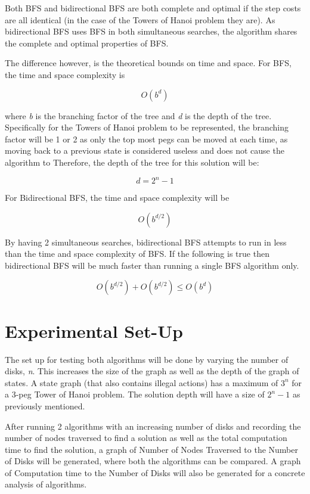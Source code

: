 \documentclass[conference]{IEEEtran}
\begin{document}
Both BFS and bidirectional BFS are both complete and optimal if the step costs are all identical (in the case of the Towers of Hanoi problem they are). As bidirectional BFS uses BFS in both simultaneous searches, the algorithm shares the complete and optimal properties of BFS.

The difference however, is the theoretical bounds on time and space. For BFS, the time and space complexity is 

\begin{equation}
 O(b^d)
\end{equation}

where \textit{b} is the branching factor of the tree and \textit{d} is the depth of the tree. Specifically for the Towers of Hanoi problem to be represented, the branching factor will be 1 or 2 as only the top most pegs can be moved at each time, as moving back to a previous state is considered useless and does not cause the algorithm to Therefore, the depth of the tree for this solution will be:

\begin{equation}
d = 2^n - 1
\end{equation}

For Bidirectional BFS, the time and space complexity will be 

\begin{equation}
 O(b^{d/2})
\end{equation}

By having 2 simultaneous searches, bidirectional BFS attempts to run in less than the time and space complexity of BFS. If 
the following is true then bidirectional BFS will be much faster than running a single BFS algorithm only. \cite{Textbook01}

\begin{equation}
O(b^{d/2}) + O(b^{d/2}) \leq O(b^d)
\end{equation}

\section{Experimental Set-Up}
The set up for testing both algorithms will be done by varying the number of disks, \textit{n}. This increases the size of the graph as well as the depth of the graph of states. A state graph (that also contains illegal actions) has a maximum of $3^n$ for a 3-peg Tower of Hanoi problem. The solution depth will have a size of $2^n-1$ as previously mentioned.

After running 2 algorithms with an increasing number of disks and recording the number of nodes traversed to find a solution as well as the total computation time to find the solution, a graph of Number of Nodes Traversed to the Number of Disks will be generated, where both the algorithms can be compared. A graph of Computation time to the Number of Disks will also be generated for a concrete analysis of algorithms.
\end{document}
